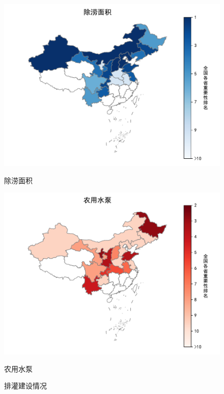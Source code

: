 \begin{figure}[htb]
    \centering
    \begin{minipage}[t]{0.49\linewidth}
      \centering
      \includegraphics[width=\linewidth]{figs/DrainIrrigate_WaterLogging}
      \caption{除涝面积}
      \label{fig:DrainIrrigate_WaterLogging}
    \end{minipage}
    \hfill
    \begin{minipage}[t]{0.49\linewidth}
      \centering
      \includegraphics[width=\linewidth]{figs/DrainIrrigate_WaterPump}
      \caption{农用水泵}
      \label{fig:DrainIrrigate_WaterPump}
    \end{minipage}
    \caption{排灌建设情况}
    \label{fig:DrainIrrigate}
  \end{figure}

